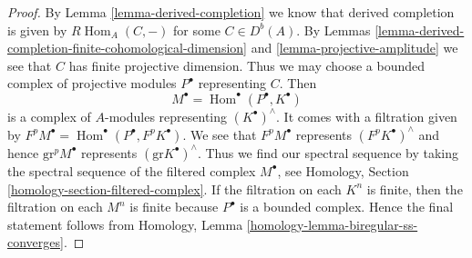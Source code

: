 \documentclass[10pt,a4paper]{amsart}
\theoremstyle{plain}
\theoremstyle{definition}
\theoremstyle{remark}
\numberwithin{equation}{subsection}
\def\Hom{\mathop{\mathrm{Hom}}\nolimits}
\begin{document}
\begin{proof}
By Lemma \ref{lemma-derived-completion} we know that derived completion is
given by $R\Hom_A(C, -)$ for some $C \in D^b(A)$. By
Lemmas \ref{lemma-derived-completion-finite-cohomological-dimension} and
\ref{lemma-projective-amplitude} we see that $C$ has finite projective
dimension. Thus we may choose a bounded complex of projective
modules $P^\bullet$ representing $C$. Then
$$
M^\bullet = \Hom^\bullet(P^\bullet, K^\bullet)
$$
is a complex of $A$-modules representing $(K^\bullet)^\wedge$.
It comes with a filtration given by
$F^pM^\bullet = \Hom^\bullet(P^\bullet, F^pK^\bullet)$.
We see that $F^pM^\bullet$ represents $(F^pK^\bullet)^\wedge$
and hence $\text{gr}^pM^\bullet$ represents $(\text{gr}K^\bullet)^\wedge$.
Thus we find our spectral sequence by taking the spectral sequence of
the filtered complex $M^\bullet$, see
Homology, Section \ref{homology-section-filtered-complex}.
If the filtration on each $K^n$ is finite, then the filtration
on each $M^n$ is finite because $P^\bullet$ is a bounded complex.
Hence the final statement follows from
Homology, Lemma \ref{homology-lemma-biregular-ss-converges}.
\end{proof}
\end{document}
